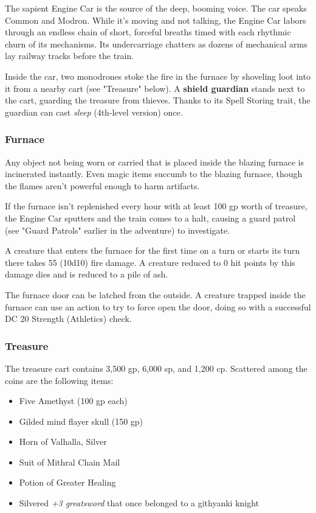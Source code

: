 \documentclass[10pt,a4paper,twoside,bg=print,twocolumn,openany,nodeprecatedcode]{dndbook}
\begin{document}
The sapient Engine Car is the source of the deep, booming voice. The car speaks Common and Modron. While it's moving and not talking, the Engine Car labors through an endless chain of short, forceful breaths timed with each rhythmic churn of its mechanisms. Its undercarriage chatters as dozens of mechanical arms lay railway tracks before the train.

Inside the car, two monodrones stoke the fire in the furnace by shoveling loot into it from a nearby cart (see "Treasure" below). A \textbf{shield guardian} stands next to the cart, guarding the treasure from thieves. Thanks to its Spell Storing trait, the guardian can cast \textit{sleep} (4th-level version) once.

\subsubsection{Furnace}
Any object not being worn or carried that is placed inside the blazing furnace is incinerated instantly. Even magic items succumb to the blazing furnace, though the flames aren't powerful enough to harm artifacts.

If the furnace isn't replenished every hour with at least 100 gp worth of treasure, the Engine Car sputters and the train comes to a halt, causing a guard patrol (see "Guard Patrols" earlier in the adventure) to investigate.

A creature that enters the furnace for the first time on a turn or starts its turn there takes 55 (10d10) fire damage. A creature reduced to 0 hit points by this damage dies and is reduced to a pile of ash.

The furnace door can be latched from the outside. A creature trapped inside the furnace can use an action to try to force open the door, doing so with a successful DC 20 Strength (Athletics) check.

\subsubsection{Treasure}
The treasure cart contains 3,500 gp, 6,000 sp, and 1,200 cp. Scattered among the coins are the following items:


\begin{itemize}
\item Five Amethyst (100 gp each)
\item Gilded mind flayer skull (150 gp)
\item Horn of Valhalla, Silver
\item Suit of Mithral Chain Mail
\item Potion of Greater Healing
\item Silvered \textit{+3 greatsword} that once belonged to a githyanki knight
\end{itemize}
\end{document}
